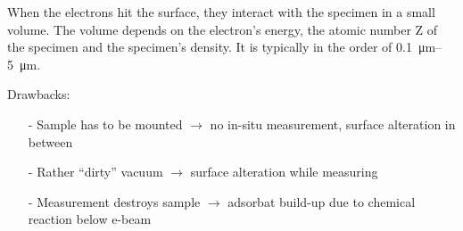 When the electrons hit the surface, they interact with the specimen in a small volume. The volume depends on the electron's energy, the atomic number Z of the specimen and the specimen's density. It is typically in the order of \SIrange{0.1}{5}{\micro \meter}.

Drawbacks:\\
\begin{itemize}
 \item[-] Sample has to be mounted $\rightarrow$ no in-situ measurement, surface alteration in between
 \item[-] Rather ``dirty'' vacuum $\rightarrow$ surface alteration while measuring
 \item[-] Measurement destroys sample $\rightarrow$ adsorbat build-up due to chemical reaction below e-beam
\end{itemize}

